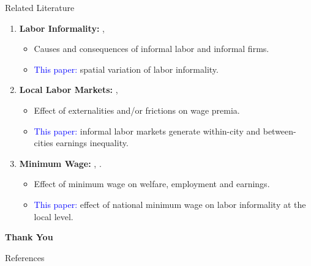 \documentclass[usenames,dvipsnames,aspectratio=169]{beamer}
\begin{document}
\begin{frame}{Related Literature}
\begin{enumerate}
    \item \textbf{Labor Informality:} \citet{Ulyssea18}, \citet{DixCarneiro21}
    \begin{itemize}
        \item Causes and consequences of informal labor and informal firms. 
        \smallskip
        \item \textcolor{blue}{This paper:} spatial variation of labor informality. 
    \end{itemize}
    
    \bigskip
    
    
    \item \textbf{Local Labor Markets:} \citet{Bilal20}, \citet{Davis19}
     \begin{itemize}
        \item Effect of externalities and/or frictions on wage premia.
        \smallskip
        \item \textcolor{blue}{This paper:} informal labor markets generate within-city and between-cities earnings inequality. 
    \end{itemize}
    
    \bigskip

    \item \textbf{Minimum Wage:} \citet{Engbom21}, \citet{Berger21}.
    \begin{itemize}
        \item Effect of minimum wage on welfare, employment and earnings. 
        \item \textcolor{blue}{This paper:} effect of national minimum wage on labor informality at the local level.
    \end{itemize}
\end{enumerate}
\end{frame}


\begin{frame}
    \begin{center}
        \textbf{\Huge{Thank You}}
    \end{center}
\end{frame}

\begin{frame}{References}
    
    
\end{frame}
\end{document}
